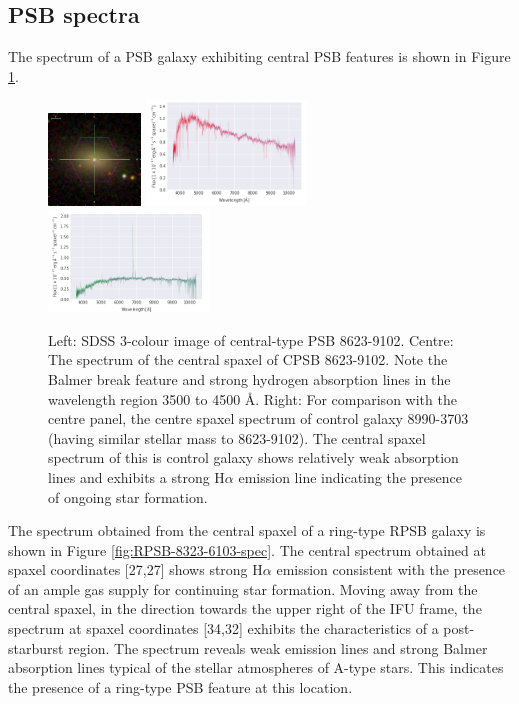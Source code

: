 \subsection{PSB spectra}
The spectrum of a PSB galaxy exhibiting central PSB features is shown in Figure \ref{fig:CPSB-8623-9102-spec}.
\begin{figure}
    \centering
    \includegraphics[width=0.22\textwidth]{images/Cutouts/CPSB-8623-9102-IM.png}
    \hfill
    \includegraphics[width=0.38\textwidth]{images/Spectra/CPSB-8623-9102.png}
    \hfill
    \includegraphics[width=0.38\textwidth]{images/Spectra/CPSB-CTRL-8990-3703-spec.png}
    \caption[Central spaxel spectrum of CPSB 8623-9102]{Left: SDSS 3-colour image of central-type PSB 8623-9102. 
    Centre: The spectrum of the central spaxel of CPSB  8623-9102. Note the Balmer break feature and strong hydrogen absorption lines in the wavelength region 3500 to 4500 \AA.
    Right: For comparison with the centre panel, the centre spaxel spectrum of control galaxy 8990-3703 (having similar stellar mass to 8623-9102). The central spaxel spectrum of this is control galaxy shows relatively weak absorption lines and exhibits a strong H$\alpha$ emission line indicating the presence of ongoing star formation.}
    \label{fig:CPSB-8623-9102-spec}
\end{figure}


The spectrum obtained from the central spaxel of a ring-type RPSB galaxy is shown in Figure \ref{fig:RPSB-8323-6103-spec}. The central spectrum obtained at spaxel coordinates [27,27] shows strong H$\alpha$ emission consistent with the presence of an ample gas supply for continuing star formation. Moving away from the central spaxel, in the direction towards the upper right of the IFU frame, the spectrum at spaxel coordinates [34,32] exhibits the characteristics of a post-starburst region. The spectrum reveals weak emission lines and strong Balmer absorption lines typical of the stellar atmospheres of A-type stars. This indicates the presence of a ring-type PSB feature at this location.

